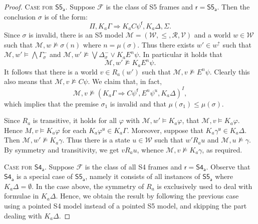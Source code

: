 \documentclass{myifcolog}
\newcommand\C {C}
\newcommand{\K}{K}
\newcommand{\agi}{a}
\newcommand{\E}{E}
\newcommand{\fw}{\mathcal{M}}
\newcommand{\f}{\mathsf{f}}
\renewcommand{\u}{\mathsf{u}}
\newcommand{\W}{\mathcal{W}}
\newcommand{\rel}{\mathcal{R}}
\newcommand{\V}{\mathcal{V}}
\numberwithin{theorem}{section}
\begin{document}
\begin{proof}
    \noindent \textsc{Case for $\mathsf{S5_\agi}$.} Suppose $\mathscr{F}$ is the class of S5 frames and $\mathsf{r} = \mathsf{S5_\agi}$. Then the conclusion $\sigma$ is of the form:
			\[
			\Pi, \K_\agi \Gamma \Rightarrow \K_\agi \C \psi^\f, \K_\agi \Delta, \Sigma.
			\]
			Since $\sigma$ is invalid, there is an S5 model $\fw = (\W, \leq, \rel, \V)$ and a world $ w \in \W$  such that $\fw, w \not \models \sigma(n)$ where $n= \mu(\sigma)$. Thus there exists $w' \in w^\uparrow$ such that $\fw, w' \models \bigwedge \Gamma_\sigma^-$ and $\fw, w' \not \models \bigvee \Delta_\sigma^- \vee \K_\agi \E^n \psi$. In particular it holds that
			\[
			\fw, w' \not \models \K_\agi \E^{n} \psi.
			\]
			It follows that there is a world $v \in R_\agi(w')$ such that $\fw, v \not \models \E^n \psi$. Clearly this also means that $\fw, v \not \models \C \psi$.  We claim that, in fact,
			\[
			\fw,v \not \models (\K_\agi \Gamma \Rightarrow \C \psi^\f, \E^n \psi^u,  \K_\agi\Delta)^I,
			\]
			which implies that the premise $\sigma_1$ is invalid and that $\mu(\sigma_1) \leq \mu(\sigma)$.
			
			Since $R_\agi$ is transitive, it holds for all $\varphi$ with $\fw, w' \models \K_\agi \varphi$, that  $\fw, v \models \K_\agi \varphi$. Hence $M, v \models \K_\agi \varphi$ for each $\K_\agi \varphi^\u \in \K_\agi \Gamma$. Moreover, suppose that $\K_\agi \gamma^\u \in \K_\agi \Delta$. Then ${\fw, w' \not \models \K_\agi \gamma}$. Thus there is a state $u \in \W$ such that $w' \mathrel{R_\agi} u$ and $\fw, u \not \models \gamma$. By symmetry and transitivity, we get $v \mathrel{R_\agi} u$, whence $\fw, v \not \models \K_\agi \gamma$, as required. \smallskip

            \noindent \textsc{Case for $\mathsf{S4_\agi}$}. Suppose $\mathscr{F}$ is the class of all S4 frames and $\mathsf{r} = \mathsf{S4_\agi}$. Observe that $\mathsf{S4_\agi}$ is a special case of $\mathsf{S5_\agi}$, namely it consists of all instances of $\mathsf{S5_\agi}$ where $\K_\agi \Delta = \emptyset$. In the case above, the symmetry of $R_\agi$ is exclusively used to deal with formulae in $\K_\agi \Delta$. Hence, we obtain the result by following the previous case using a pointed S4 model instead of a pointed S5 model, and skipping the part dealing with $\K_\agi \Delta$. \smallskip


\end{proof}
\end{document}
